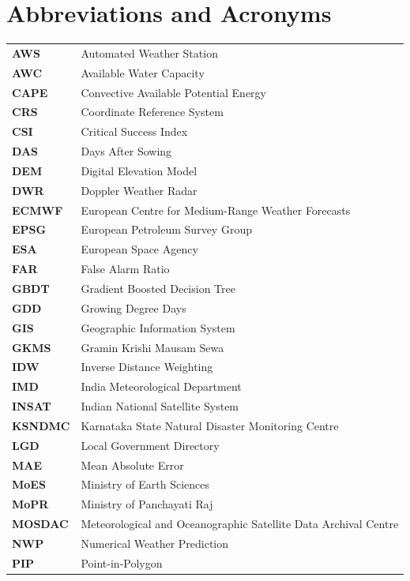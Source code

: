 \documentclass[11pt,a4paper,oneside]{report}
\begin{document}
\section*{Abbreviations and Acronyms}
\begin{tabular}{ll}
\textbf{AWS} & Automated Weather Station \\
\textbf{AWC} & Available Water Capacity \\
\textbf{CAPE} & Convective Available Potential Energy \\
\textbf{CRS} & Coordinate Reference System \\
\textbf{CSI} & Critical Success Index \\
\textbf{DAS} & Days After Sowing \\
\textbf{DEM} & Digital Elevation Model \\
\textbf{DWR} & Doppler Weather Radar \\
\textbf{ECMWF} & European Centre for Medium-Range Weather Forecasts \\
\textbf{EPSG} & European Petroleum Survey Group \\
\textbf{ESA} & European Space Agency \\
\textbf{FAR} & False Alarm Ratio \\
\textbf{GBDT} & Gradient Boosted Decision Tree \\
\textbf{GDD} & Growing Degree Days \\
\textbf{GIS} & Geographic Information System \\
\textbf{GKMS} & Gramin Krishi Mausam Sewa \\
\textbf{IDW} & Inverse Distance Weighting \\
\textbf{IMD} & India Meteorological Department \\
\textbf{INSAT} & Indian National Satellite System \\
\textbf{KSNDMC} & Karnataka State Natural Disaster Monitoring Centre \\
\textbf{LGD} & Local Government Directory \\
\textbf{MAE} & Mean Absolute Error \\
\textbf{MoES} & Ministry of Earth Sciences \\
\textbf{MoPR} & Ministry of Panchayati Raj \\
\textbf{MOSDAC} & Meteorological and Oceanographic Satellite Data Archival Centre \\
\textbf{NWP} & Numerical Weather Prediction \\
\textbf{PIP} & Point-in-Polygon \\

\end{tabular}
\end{document}
